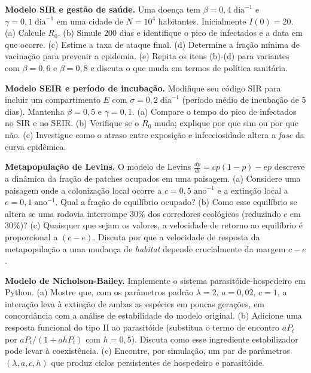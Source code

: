 \begin{exercicio}
\textbf{Modelo SIR e gestão de saúde.} Uma doença tem $\beta = 0{,}4\;\mathrm{dia}^{-1}$
e $\gamma = 0{,}1\;\mathrm{dia}^{-1}$ em uma cidade de $N = 10^4$ habitantes.
Inicialmente $I(0) = 20$. (a) Calcule $R_0$. (b) Simule 200 dias e
identifique o pico de infectados e a data em que ocorre. (c) Estime a taxa
de ataque final. (d) Determine a fração mínima de vacinação para prevenir a
epidemia. (e) Repita os itens (b)-(d) para variantes com $\beta = 0{,}6$ e
$\beta = 0{,}8$ e discuta o que muda em termos de política sanitária.
\end{exercicio}

\begin{exercicio}
\textbf{Modelo SEIR e período de incubação.} Modifique seu código SIR para
incluir um compartimento $E$ com $\sigma = 0{,}2\;\mathrm{dia}^{-1}$
(período médio de incubação de 5 dias). Mantenha $\beta = 0{,}5$ e $\gamma = 0{,}1$.
(a) Compare o tempo do pico de infectados no SIR e no SEIR.
(b) Verifique se o $R_0$ muda; explique por que sim ou por que não.
(c) Investigue como o atraso entre exposição e infecciosidade altera a
\emph{fase} da curva epidêmica.
\end{exercicio}

\begin{exercicio}
\textbf{Metapopulação de Levins.} O modelo de Levins
$\tfrac{dp}{dt} = cp(1-p) - ep$
descreve a dinâmica da fração de patches ocupados em uma paisagem. (a)
Considere uma paisagem onde a colonização local ocorre a $c = 0{,}5\;\mathrm{ano}^{-1}$
e a extinção local a $e = 0{,}1\;\mathrm{ano}^{-1}$. Qual a fração de equilíbrio
ocupado? (b) Como esse equilíbrio se altera se uma rodovia interrompe $30\%$
dos corredores ecológicos (reduzindo $c$ em $30\%$)? (c) Quaisquer que sejam
os valores, a velocidade de retorno ao equilíbrio é proporcional a $(c-e)$.
Discuta por que a velocidade de resposta da metapopulação a uma mudança de
\emph{habitat} depende crucialmente da margem $c - e$.
\end{exercicio}

\begin{exercicio}
\textbf{Modelo de Nicholson-Bailey.} Implemente o sistema parasitóide-hospedeiro
em Python. (a) Mostre que, com os parâmetros padrão
$\lambda = 2$, $a = 0{,}02$, $c = 1$, a interação leva à extinção de ambas
as espécies em poucas gerações, em concordância com a análise de estabilidade
do modelo original. (b) Adicione uma resposta funcional do tipo II ao parasitóide
(substitua o termo de encontro $a P_t$ por $a P_t / (1 + a h P_t)$ com
$h = 0{,}5$). Discuta como esse ingrediente estabilizador pode levar à
coexistência. (c) Encontre, por simulação, um par de parâmetros
$(\lambda, a, c, h)$ que produz ciclos persistentes de hospedeiro e parasitóide.
\end{exercicio}

